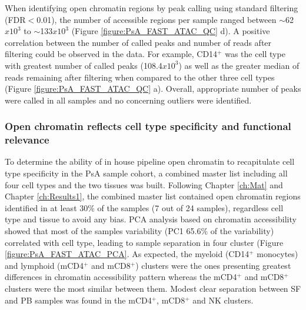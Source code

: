 When identifying open chromatin regions by peak calling using standard filtering (FDR$<$0.01), the number of accessible regions per sample ranged between $\sim$62$x10^3$ to $\sim$133$x10^3$ (Figure \ref{figure:PsA_FAST_ATAC_QC} d). A positive correlation between the number of called peaks and number of reads after filtering could be observed in the data. For example, CD14$^+$ was the cell type with greatest number of called peaks (108.4$x10^3$) as well as the greater median of reads remaining after filtering when compared to the other three cell types (Figure \ref{figure:PsA_FAST_ATAC_QC} a). Overall, appropriate number of peaks were called in all samples and no concerning outliers were identified.



\subsubsection{Open chromatin reflects cell type specificity and functional relevance}
To determine the ability of in house pipeline open chromatin to recapitulate cell type specificity in the PsA sample cohort, a combined master list including all four cell types and the two tissues was built. Following Chapter \ref{ch:Mat} and Chapter \ref{ch:Results1}, the combined master list contained open chromatin regions identified in at least 30\% of the samples (7 out of 24 samples), regardless cell type and tissue to avoid any bias. PCA analysis based on chromatin accessibility showed that most of the samples variability (PC1 65.6\% of the variability) correlated with cell type, leading to sample separation in four cluster (Figure \ref{figure:PsA_FAST_ATAC_PCA}. As expected, the myeloid (CD14$^+$ monocytes) and lymphoid (mCD4$^+$ and mCD8$^+$) clusters were the ones presenting greatest differences in chromatin accessibility pattern whereas the mCD4$^+$ and mCD8$^+$ clusters were the most similar between them. Modest clear separation between SF and PB samples was found in the mCD4$^+$, mCD8$^+$ and NK clusters.

